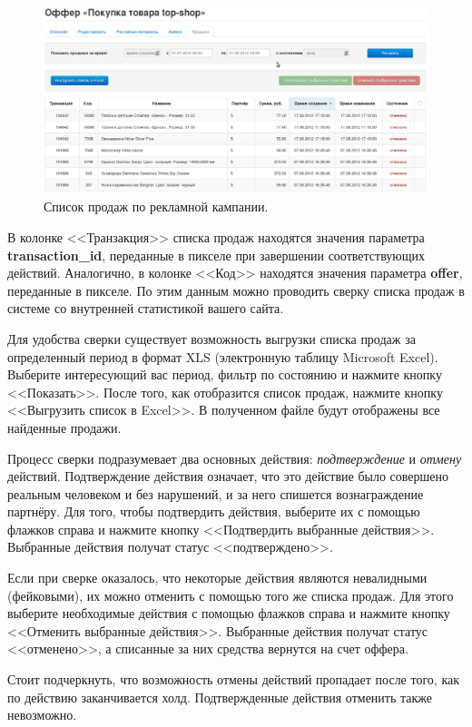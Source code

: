 \documentclass[a4paper,12pt]{article}
\begin{document}
\begin{figure}[!ht]
\centering
\includegraphics[width=\textwidth]{include/sales.png}
\caption{Список продаж по рекламной кампании.}
\label{fig:sales}
\end{figure}

В колонке <<Транзакция>> списка продаж находятся значения параметра \textbf{transaction\_id}, переданные в пикселе при завершении соответствующих действий. Аналогично, в колонке <<Код>> находятся значения параметра \textbf{offer}, переданные в пикселе. По этим данным можно проводить сверку списка продаж в системе \heymoose{} со внутренней статистикой вашего сайта.

Для удобства сверки существует возможность выгрузки списка продаж за определенный период в формат XLS (электронную таблицу Microsoft Excel). Выберите интересующий вас период, фильтр по состоянию и нажмите кнопку <<Показать>>. После того, как отобразится список продаж, нажмите кнопку <<Выгрузить список в Excel>>. В полученном файле будут отображены все найденные продажи.

Процесс сверки подразумевает два основных действия: \textit{подтверждение} и \textit{отмену} действий. Подтверждение действия означает, что это действие было совершено реальным человеком и без нарушений, и за него спишется вознаграждение партнёру. Для того, чтобы подтвердить действия, выберите их с помощью флажков справа и нажмите кнопку <<Подтвердить выбранные действия>>. Выбранные действия получат статус <<подтверждено>>.

Если при сверке оказалось, что некоторые действия являются невалидными (фейковыми), их можно отменить с помощью того же списка продаж. Для этого выберите необходимые действия с помощью флажков справа и нажмите кнопку <<Отменить выбранные действия>>. Выбранные действия получат статус <<отменено>>, а списанные за них средства вернутся на счет оффера.

Стоит подчеркнуть, что возможность отмены действий пропадает после того, как по действию заканчивается холд. Подтвержденные действия отменить также невозможно.
\end{document}
